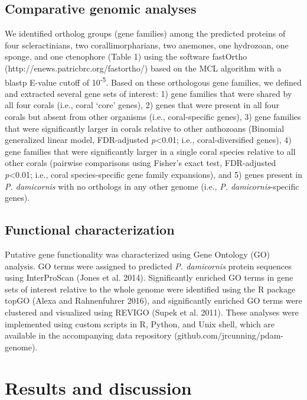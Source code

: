 \documentclass[]{elsarticle} %
\begin{document}
\subsection{Comparative genomic
analyses}\label{comparative-genomic-analyses}

We identified ortholog groups (gene families) among the predicted
proteins of four scleractinians, two corallimorpharians, two anemones,
one hydrozoan, one sponge, and one ctenophore (Table 1) using the
software fastOrtho (http://enews.patricbrc.org/fastortho/) based on the
MCL algorithm with a blastp E-value cutoff of 10\textsuperscript{-5}.
Based on these orthologous gene families, we defined and extracted
several gene sets of interest: 1) gene families that were shared by all
four corals (i.e., coral `core' genes), 2) genes that were present in
all four corals but absent from other organisms (i.e., coral-specific
genes), 3) gene families that were significantly larger in corals
relative to other anthozoans (Binomial generalized linear model,
FDR-adjusted \emph{p}\textless{}0.01; i.e., coral-diversified genes), 4)
gene families that were significantly larger in a single coral species
relative to all other corals (pairwise comparisons using Fisher's exact
test, FDR-adjusted \emph{p}\textless{}0.01; i.e., coral species-specific
gene family expansions), and 5) genes present in \emph{P. damicornis}
with no orthologs in any other genome (i.e., \emph{P.
damicornis}-specific genes).

\subsection{Functional
characterization}\label{functional-characterization}

Putative gene functionality was characterized using Gene Ontology (GO)
analysis. GO terms were assigned to predicted \emph{P. damicornis}
protein sequences using InterProScan (Jones et al. 2014). Significantly
enriched GO terms in gene sets of interest relative to the whole genome
were identified using the R package topGO (Alexa and Rahnenfuhrer 2016),
and significantly enriched GO terms were clustered and visualized using
REVIGO (Supek et al. 2011). These analyses were implemented using custom
scripts in R, Python, and Unix shell, which are available in the
accompanying data repository (github.com/jrcunning/pdam-genome).

\section{Results and discussion}\label{results-and-discussion}
\end{document}
